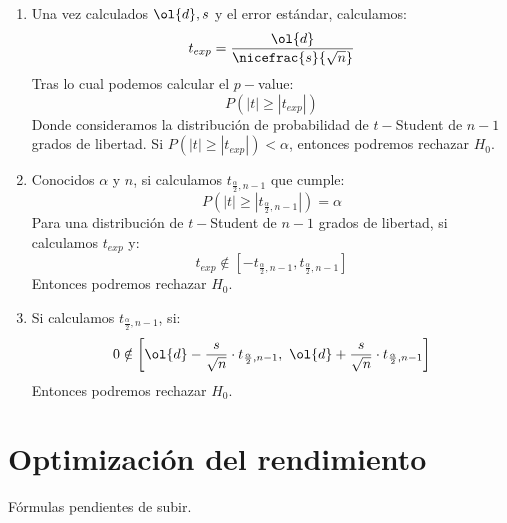 \begin{enumerate}
    \item Una vez calculados $\ol{d},s$ y el error estándar, calculamos:
        \begin{equation*}
            t_{exp} = \dfrac{\ol{d}}{\nicefrac{s}{\sqrt{n}}}
        \end{equation*}
        Tras lo cual podemos calcular el $p-$value:
        \begin{equation*}
            P(|t| \geq |t_{exp}|)
        \end{equation*}
        Donde consideramos la distribución de probabilidad de $t-$Student de $n-1$ grados de libertad. Si $P(|t|\geq |t_{exp}|) < \alpha$, entonces podremos rechazar $H_0$.
    \item Conocidos $\alpha$ y $n$, si calculamos $t_{\frac{\alpha}{2},n-1}$ que cumple:
        \begin{equation*}
            P(|t| \geq |t_{\frac{\alpha}{2},n-1}|) = \alpha
        \end{equation*}
        Para una distribución de $t-$Student de $n-1$ grados de libertad, si calculamos $t_{exp}$ y:
        \begin{equation*}
            t_{exp} \notin \left[-t_{\frac{\alpha}{2},n-1}, t_{\frac{\alpha}{2},n-1}\right]
        \end{equation*}
        Entonces podremos rechazar $H_0$.
    \item Si calculamos $t_{\frac{\alpha}{2},n-1}$, si:
        \begin{equation*}
            0\notin \left[\ol{d}-\frac{s}{\sqrt{n}} \cdot t_{\frac{\alpha}{2},n-1},~\ol{d}+\frac{s}{\sqrt{n}} \cdot t_{\frac{\alpha}{2},n-1}\right]
        \end{equation*}
        Entonces podremos rechazar $H_0$.
\end{enumerate}

\section{Optimización del rendimiento}
Fórmulas pendientes de subir.
